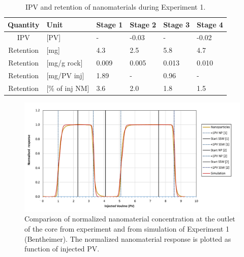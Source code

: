 \documentclass[energies,article,submit,moreauthors,pdftex]{Definitions/mdpi}
\begin{document}
\begin{table}[h!] %
\small
\centering
\caption{IPV and retention of nanomaterials during Experiment 1.}
\label{tab:ipvexp1}
\begin{tabular}{c l l l l l } 
\toprule
\textbf{Quantity} & \textbf{Unit} & \textbf{Stage 1} & \textbf{Stage 2} & \textbf{Stage 3} & \textbf{Stage 4} \\ 
\midrule 
IPV         & [PV]          & -         & -0.03     & -         & -0.02     \\
Retention   & [mg]          & 4.3       & 2.5       & 5.8       & 4.7       \\ 
Retention   & [mg/g rock]   & 0.009     & 0.005     & 0.013     & 0.010     \\ 
Retention   & [mg/PV inj]   & 1.89      & -         & 0.96      & -         \\
Retention   & [\% of inj NM]& 3.6       & 2.0       & 1.8       & 1.5       \\ 
\bottomrule
\end{tabular}
\end{table}

\begin{figure}[h!]
    \centering
    \includegraphics[width=.8\textwidth]{fig/simExpNP.png}
    \caption{Comparison of normalized nanomaterial concentration at the outlet of the core from experiment and from simulation of Experiment 1 (Bentheimer). The normalized nanomaterial response is plotted as function of injected PV.}
    \label{cht:simExpNP}
\end{figure}
\end{document}
